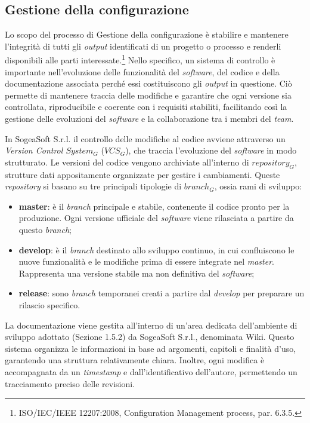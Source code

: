     
        \subsection{Gestione della configurazione}
        Lo scopo del processo di Gestione della configurazione è stabilire e mantenere l'integrità di tutti gli \textit{output} identificati di un progetto o processo e renderli disponibili alle parti interessate.\footnote{ISO/IEC/IEEE 12207:2008, Configuration Management process, par. 6.3.5.}
        \noindent Nello specifico, un sistema di controllo è importante nell'evoluzione delle funzionalità del \textit{software}, del codice e della documentazione associata perché essi costituiscono gli \textit{output} in questione. Ciò permette di mantenere traccia delle modifiche e garantire che ogni versione sia controllata, riproducibile e coerente con i requisiti stabiliti, facilitando così la gestione delle evoluzioni del \textit{software} e la collaborazione tra i membri del \textit{team}. 

        \noindent In SogeaSoft S.r.l. il controllo delle modifiche al codice avviene attraverso un \textit{Version Control $System_G$} ($VCS_G$), che traccia l’evoluzione del \textit{software} in modo strutturato. Le versioni del codice vengono archiviate all’interno di \textit{$repository_G$}, strutture dati appositamente organizzate per gestire i cambiamenti. 
        \noindent Queste \textit{repository} si basano su tre principali tipologie di \textit{$branch_G$}, ossia rami di sviluppo:  
        \begin{itemize}
            \item \textbf{master}: è il \textit{branch} principale e stabile, contenente il codice pronto per la produzione. Ogni versione ufficiale del \textit{software} viene rilasciata a partire da questo \textit{branch}; 
            \item \textbf{develop}: è il \textit{branch} destinato allo sviluppo continuo, in cui confluiscono le nuove funzionalità e le modifiche prima di essere integrate nel \textit{master}. Rappresenta una versione stabile ma non definitiva del \textit{software}; 
            \item \textbf{release}: sono \textit{branch} temporanei creati a partire dal \textit{develop} per preparare un rilascio specifico. 
        \end{itemize}

        \noindent La documentazione viene gestita all'interno di un'area dedicata dell'ambiente di sviluppo adottato (Sezione 1.5.2) da SogeaSoft S.r.l., denominata Wiki. Questo sistema organizza le informazioni in base ad argomenti, capitoli e finalità d'uso, garantendo una struttura relativamente chiara. Inoltre, ogni modifica è accompagnata da un \textit{timestamp} e dall'identificativo dell'autore, permettendo un tracciamento preciso delle revisioni. 
        

